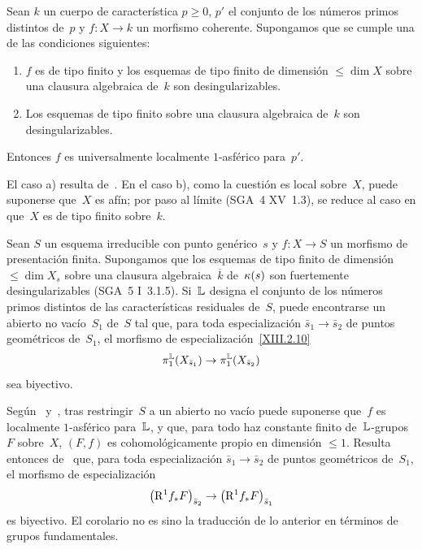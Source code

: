 
\begin{corollaire}
\label{XIII.3.4}
Sean $k$ un cuerpo de característica $p\geqslant0$, $p'$ el conjunto de
los números primos distintos de~$p$ y $f\colon X\to k$ un morfismo
coherente. Supongamos que se cumple una de las condiciones siguientes:
\begin{enumerate}
\item[a)] $f$ es de tipo finito y los esquemas de tipo finito de dimensión
$\leqslant\dim X$ sobre una clausura algebraica de~$k$ son
desingularizables.
\item[b)] Los esquemas de tipo finito sobre una clausura algebraica de~$k$
son desingularizables.
\end{enumerate}
Entonces $f$ es universalmente localmente $1$-asférico para~$p'$.
\end{corollaire}

El caso a) resulta de~. En el caso b), como la cuestión es
local sobre~$X$, puede suponerse que~$X$ es afín; por paso al límite
(SGA~4 XV~1.3), se reduce al caso en que~$X$ es de tipo finito sobre~$k$.

\begin{corollaire}
\label{XIII.3.5}
Sean
$S$ un esquema irreducible con punto genérico~$s$ y $f\colon X\to S$ un
morfismo de presentación finita. Supongamos que los esquemas de tipo finito
de dimensión $\leqslant\dim X_s$ sobre una clausura
algebraica~$\overline{k}$ de~$\kappa(s)$ son fuertemente desingularizables
\textup{(SGA~5 I~3.1.5)}. Si~$\mathbb L$ designa el conjunto de los números primos
distintos de las características residuales de~$S$, puede encontrarse un
abierto no vacío~$S_1$ de~$S$ tal que, para toda especialización
$\bar{s}_1\to\bar{s}_2$ de puntos geométricos de~$S_1$, el morfismo de
especialización~\eqref{XIII.2.10}
$$
\pi_1^{\mathbb L}(X_{\bar{s}_1})\to\pi_1^{\mathbb L}(X_{\bar{s}_2})
$$
sea biyectivo.
\end{corollaire}

Según~ y~, tras restringir~$S$ a un abierto no
vacío puede suponerse que~$f$ es localmente $1$-asférico para~$\mathbb L$, y que,
para todo haz constante finito de~$\mathbb L$-grupos~$F$ sobre~$X$, $(F,f)$ es
cohomológicamente propio en dimensión $\leqslant 1$. Resulta entonces
de~ que, para toda especialización
$\bar{s}_1\to\bar{s}_2$ de puntos geométricos de~$S_1$, el morfismo de
especialización
$$
\left(\mathrm{R}^1 f_* F\right)_{\bar{s}_2} \to \left(\mathrm{R}^1 f_*
F\right)_{\bar{s}_1}
$$
es biyectivo. El corolario no es sino la traducción de lo anterior en
términos de grupos fundamentales.

